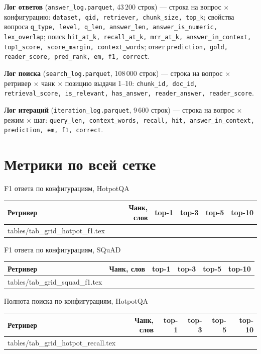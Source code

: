 \textbf{Лог ответов} (\texttt{answer\_log.parquet}, 43\,200 строк) --- строка на вопрос $\times$ конфигурацию: \texttt{dataset, qid, retriever, chunk\_size, top\_k}; свойства вопроса \texttt{q\_type, level, q\_len, answer\_len, answer\_is\_numeric, lex\_overlap}; поиск \texttt{hit\_at\_k, recall\_at\_k, mrr\_at\_k, answer\_in\_context, top1\_score, score\_margin, context\_words}; ответ \texttt{prediction, gold, reader\_score, pred\_rank, em, f1, correct}.

\textbf{Лог поиска} (\texttt{search\_log.parquet}, 108\,000 строк) --- строка на вопрос $\times$ ретривер $\times$ чанк $\times$ позицию выдачи 1--10: \texttt{chunk\_id, doc\_id, retrieval\_score, is\_relevant, has\_answer, reader\_answer, reader\_score}.

\textbf{Лог итераций} (\texttt{iteration\_log.parquet}, 9\,600 строк) --- строка на вопрос $\times$ режим $\times$ шаг: \texttt{query\_len, context\_words, recall, hit, answer\_in\_context, prediction, em, f1, correct}.

\par\endgroup

\section{Метрики по всей сетке}\label{app:grid}

\begin{gosttable}{F1 ответа по конфигурациям, HotpotQA}
\begin{tabular}{lrrrrr}
\toprule
Ретривер & Чанк, слов & top-1 & top-3 & top-5 & top-10 \\
\midrule
{} tables/tab_grid_hotpot_f1.tex 
\bottomrule
\end{tabular}
\end{gosttable}

\begin{gosttable}{F1 ответа по конфигурациям, SQuAD}
\begin{tabular}{lrrrrr}
\toprule
Ретривер & Чанк, слов & top-1 & top-3 & top-5 & top-10 \\
\midrule
{} tables/tab_grid_squad_f1.tex 
\bottomrule
\end{tabular}
\end{gosttable}

\begin{gosttable}{Полнота поиска по конфигурациям, HotpotQA}
\begin{tabular}{lrrrrr}
\toprule
Ретривер & Чанк, слов & top-1 & top-3 & top-5 & top-10 \\
\midrule
{} tables/tab_grid_hotpot_recall.tex 
\bottomrule
\end{tabular}
\end{gosttable}

